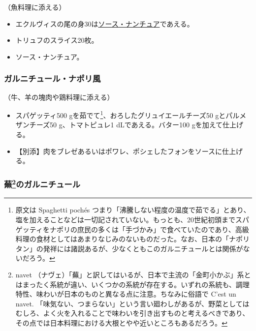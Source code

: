\begin{recette}
（魚料理に添える）

\begin{itemize}
\item
  エクルヴィスの尾の身30は\protect\hyperlink{sauce-nantua}{ソース・ナンチュア}であえる。
\item
  トリュフのスライス20枚。
\item
  ソース・ナンチュア。
\end{itemize}

\atoaki{}

\hypertarget{garniture-a-la-napolitaine}{%
\subsubsection{ガルニチュール・ナポリ風}\label{garniture-a-la-napolitaine}}



（牛、羊の塊肉や鶏料理に添える）

\begin{itemize}
\item
  スパゲッティ500 gを茹でて\footnote{原文は Spaghetti pochés
    つまり「沸騰しない程度の温度で茹でる」とあり、塩を加えることなどは一切記されていない。もっとも、20世紀初頭までスパゲッティをナポリの庶民の多くは「手づかみ」で食べていたのであり、高級料理の食材としてはあまりなじみのないものだった。なお、日本の「ナポリタン」の発祥には諸説あるが、少なくともこのガルニチュールとは関係がないだろう。}、おろしたグリュイエールチーズ50
  gとパルメザンチーズ50 g、トマトピュレ1 dLであえる。バター100
  gを加えて仕上げる。
\item
  【別添】肉をブレゼあるいはポワレ、ポシェしたフォンをソースに仕上げる。
\end{itemize}

\atoaki{}

\hypertarget{garniture-aux-navets}{%
\subsubsection[蕪のガルニチュール]{\texorpdfstring{蕪\footnote{navet
  （ナヴェ）「蕪」と訳してはいるが、日本で主流の「金町小かぶ」系とはまったく系統が違い、いくつかの系統が存在する。いずれの系統も、調理特性、味わいが日本のものと異なる点に注意。ちなみに俗語で
  C'est un navet.
  「味気ない、つまらない」という言い廻わしがあるが、野菜としてはむしろ、よく火を入れることで味わいを引き出すものと考えるべきであり、その点では日本料理における大根とやや近いところもあるだろう。}のガルニチュール}{蕪のガルニチュール}}\label{garniture-aux-navets}}


\end{recette}
